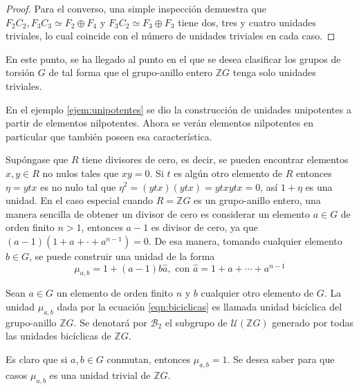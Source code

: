 \begin{proof}
Para el converso, una simple inspección demuestra que $F_2C_2, F_3C_3 \simeq F_2\oplus F_4$ y $F_3C_2 \simeq F_3 \oplus F_3$ tiene dos, tres y cuatro unidades triviales, lo cual coincide con el número de unidades triviales en cada caso. 
\end{proof}

En este punto, se ha llegado al punto en el que se desea clasificar los grupos de torsión $G$ de tal forma que el grupo-anillo entero $\mathds{Z}G$ tenga solo unidades triviales.

\begin{ejemplo}
En el ejemplo \ref{ejem:unipotentes} se dio la construcción de unidades unipotentes a partir de elementos nilpotentes. Ahora se verán elementos nilpotentes en particular que también poseen esa característica. 

Supóngase que $R$ tiene divisores de cero, es decir, se pueden encontrar elementos $x,y \in R$ no nulos tales que $xy = 0$. Si $t$ es algún otro elemento de $R$ entonces $\eta =ytx$ es no nulo tal que $\eta ^2 = (ytx)(ytx) = ytxytx = 0$, así $1+\eta$ es una unidad. En el caso especial cuando $R =\mathds{Z}G$ es un grupo-anillo entero, una manera sencilla de obtener un divisor de cero es considerar un elemento $a \in G$ de orden finito $ n >1$, entonces $a-1$ es divisor de cero, ya que $(a-1)(1+a+\cdot+a^{n-1})=0$. De esa manera, tomando cualquier elemento $b \in G$, se puede construir una unidad de la forma 
\begin{equation}\label{eqn:biciclicas}
\mu_{a,b} = 1+(a-1)b\hat{a}, \mbox{ con } \hat{a} = 1+a+\cdots+a^{n-1}
\end{equation}
\end{ejemplo}

\begin{definicion}
Sean $a \in G$ un elemento de orden finito $n$ y $b$ cualquier otro elemento de $G$. La unidad $\mu_{a,b}$ dada por la ecuación \ref{eqn:biciclicas} es llamada unidad bicíclica del grupo-anillo $\mathds{Z}G$. Se denotará por $\mathcal{B}_2$ el subgrupo de $\mathcal{U}(\mathds{Z}G)$ generado por todas las unidades bicíclicas de $\mathds{Z}G$.
\end{definicion}

Es claro que si $a,b \in G$ conmutan, entonces $\mu_{a,b} = 1$. Se desea saber para que casos $\mu_{a,b}$ es una unidad trivial de $\mathds{Z}G$.

